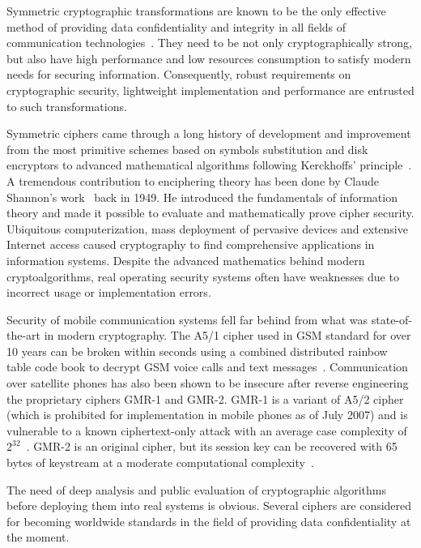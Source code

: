 \label{sec:intro}

Symmetric cryptographic transformations are known to be the only effective method
of providing data confidentiality and integrity in all fields of communication
technologies~\cite{moldovyan2007innovative}. They need to be not only
cryptographically strong, but also have high performance and low resources
consumption to satisfy modern needs for securing information. Consequently,
robust requirements on cryptographic security, lightweight implementation and
performance are entrusted to such transformations.

Symmetric ciphers came through a long history of development and improvement
from the most primitive schemes based on symbols substitution and disk
encryptors to advanced mathematical algorithms following Kerckhoffs'
principle~\cite{kahn1996codebreakers}.
A tremendous contribution to enciphering theory has been done by Claude
Shannon's work~\cite{shannon:secrecy} back in 1949. He introduced the
fundamentals of information theory and made it possible to evaluate and
mathematically prove cipher security. Ubiquitous computerization, mass
deployment of pervasive devices and extensive Internet access caused
cryptography to find comprehensive applications in information systems. Despite
the advanced mathematics behind modern cryptoalgorithms, real operating
security systems often have weaknesses due to incorrect usage or implementation
errors.

Security of mobile communication systems fell far behind from what was
state-of-the-art in modern cryptography. The A5/1 cipher used in GSM standard
for over 10 years can be broken within seconds using a combined distributed
rainbow table code book to decrypt GSM voice calls and text
messages~\cite{secproject}.
Communication over satellite phones has also been shown to be insecure after
reverse engineering the proprietary ciphers \mbox{GMR-1} and \mbox{GMR-2}.
\mbox{GMR-1} is a variant of A5/2 cipher (which is prohibited for
implementation in mobile phones as of July 2007) and is vulnerable to a known
ciphertext-only attack with an average case complexity of
$2^{32}$~\cite{3gpp:a52:2007}.
\mbox{GMR-2} is an original cipher, but its session key can be recovered with
65 bytes of keystream at a moderate computational
complexity~\cite{kiyanchuk:zuc}. 

The need of deep analysis and public evaluation of cryptographic algorithms
before deploying them into real systems is obvious. Several ciphers are
considered for becoming worldwide standards in the field of providing data
confidentiality at the moment. 

